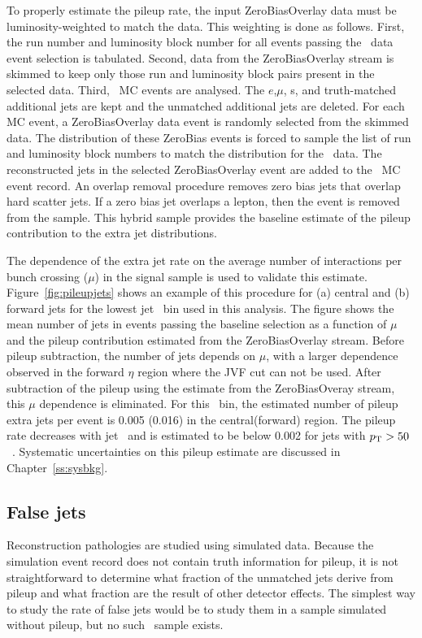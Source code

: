 To properly estimate the pileup rate, the input ZeroBiasOverlay data must be luminosity-weighted
to match the data.  This weighting is done as follows.  First, the run number and luminosity block number 
for all events passing the \emubb\ data event selection is tabulated.  Second, data from the ZeroBiasOverlay
stream is skimmed to keep only those run and luminosity block pairs present in the selected data.
Third, \ttbar\ MC events are analysed.
The $e$,$\mu$, \bjet s, and truth-matched additional jets are kept and the unmatched
additional jets are deleted.  For each MC event, a ZeroBiasOverlay data event is 
randomly selected from the skimmed data.
The distribution of these ZeroBias events is forced to sample the list of run and luminosity block numbers
to match the distribution for the \emubb\ data.  The reconstructed jets in the selected ZeroBiasOverlay
event are added to the \ttbar\ MC event record.  An overlap 
removal procedure removes zero bias jets that overlap hard scatter jets.
If a zero bias jet overlaps a lepton, then the event is removed from the sample. 
This hybrid sample provides the baseline estimate of the pileup contribution to the 
extra jet distributions. 

The dependence of the extra jet rate on the average number of interactions per bunch crossing ($\mu$) in the signal sample is used to validate this estimate. %
 Figure~\ref{fig:pileupjets} shows an example of this procedure for (a) central and (b) forward jets for the lowest jet \pt\ bin used in this analysis. The figure shows the mean number of jets in events passing the baseline selection as a function of $\mu$ and the pileup contribution estimated from the ZeroBiasOverlay stream. Before pileup subtraction, the number of jets depends on $\mu$, with a larger dependence observed in the forward $\eta$ region where the JVF cut can not be used. After subtraction of the pileup using the estimate from the ZeroBiasOveray stream, this $\mu$ dependence is eliminated. For this \pt\ bin, the estimated number of pileup extra jets per
event is 0.005 (0.016) in the central(forward) region. 
The pileup rate decreases with jet \pT\ and is estimated to be below 0.002 for jets with $p_{\text{T}}>50$~\GeV.
Systematic uncertainties on this pileup estimate are discussed in Chapter~\ref{ss:sysbkg}.
 
 \subsection{False jets}
Reconstruction pathologies are studied using simulated data. Because the simulation event record does not contain truth information for pileup, it is not straightforward to determine what fraction of the unmatched jets derive from pileup and what fraction are the result of other detector effects. The simplest way to study the rate of false jets would be to study them in a sample simulated without pileup, but no such \ttbar\ sample exists. 


